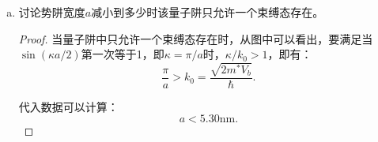 \documentclass[reqno,a4paper,12pt]{amsart}
\begin{document}
\begin{enumerate}[a)]
\begin{proof}
考虑第一种情况：$\tan(\kappa a/2) = \frac{k}{\kappa}$，注意到：
\[
	\frac{1}{\cos^2(\kappa a/2)} = 1 + \tan^2(\kappa a/2) = 1 + \frac{k^2}{\kappa^2} = \frac{k_0^2}{\kappa^2}.
\]

其中$k_0^2 = \kappa^2 + k^2 = \frac{2mV_0}{\hbar^2}$。则原方程化为：
\[
	\left\vert \cos\left( \frac{\kappa a}{2} \right) \right\vert = \frac{\kappa}{k_0}, \ \ \text{同时满足} \ \ \tan\left( \frac{\kappa a}{2} \right) > 0.
\]

考虑第二种情况：$\tan(\kappa a/2) = -\frac{\kappa}{k}$，注意到：
\[
	\frac{1}{\sin^2(\kappa a/2)} = 1 + \cot^2(\kappa a/2) = 1 + \frac{k^2}{\kappa^2} = \frac{k_0^2}{\kappa^2}.
\]

则原方程化为：
\[
	\left\vert \sin\left( \frac{\kappa a}{2} \right) \right\vert = \frac{\kappa}{k_0}, \ \ \text{同时满足} \ \ \tan\left( \frac{\kappa a}{2} \right) < 0.
\]

示意图如下：
\begin{center}
	\texttt{[image: homework02\_02.jpeg]}
\end{center}

其中红色曲线对应第一种情况，绿色曲线对应第二种情况，与蓝色直线的交点即为方程的解。

代入数据可得，能量最低的两个能量分别为：
\[
	E_1 = -0.195\text{eV}; \ \ E_2 = -0.180\text{eV}.
\]

对于无限深势阱，本征能量为：
\[
	E_n = \frac{n^2\pi^2\hbar^2}{2m^*a^2}, \ \ n = 1,2,\cdots.
\]

即：
\[
	E_{10} = 6.24\times 10^{-3}\text{eV}; \ \ E_{20} = 2.50\times 10^{-2}eV.
\]

若选取势阱底部为零势能面，有限深势阱下最低两个束缚态能量本征值分别为：
\[
	E_1' = 0.005eV; \ \ E_2' = 0.020eV.
\]

由于无限深势阱条件下，波函数仅被束缚在势阱内，势阱外严格为零；而有限高的势阱外波函数可以不为零。意味着无限深势阱条件下位置不确定度相对于有限深势阱更小，利用不确定性关系，意味着无限深势阱的栋梁不确定度更大，从而能量更高。
\end{proof}

\item 讨论势阱宽度$a$减小到多少时该量子阱只允许一个束缚态存在。

\begin{proof}
当量子阱中只允许一个束缚态存在时，从图中可以看出，要满足当$\sin(\kappa a/2)$第一次等于1，即$\kappa = \pi/a$时，$\kappa/k_0>1$，即有：
\[
	\frac{\pi}{a} > k_0 = \frac{\sqrt{2m^*V_b}}{\hbar}.
\]

代入数据可以计算：
\[
	a<5.30\text{nm}.
\]


\end{proof}
\end{enumerate}
\end{document}
